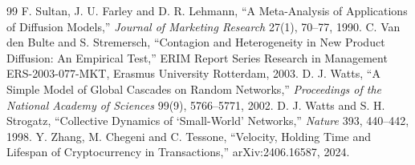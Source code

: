 \documentclass[10pt,a4paper]{article}
\theoremstyle{remark}
\begin{document}
\begin{thebibliography}{99}
 F. Sultan, J. U. Farley and D. R. Lehmann, ``A Meta-Analysis of Applications of Diffusion Models,'' \emph{Journal of Marketing Research} 27(1), 70--77, 1990.
 C. Van den Bulte and S. Stremersch, ``Contagion and Heterogeneity in New Product Diffusion: An Empirical Test,'' ERIM Report Series Research in Management ERS-2003-077-MKT, Erasmus University Rotterdam, 2003.
 D. J. Watts, ``A Simple Model of Global Cascades on Random Networks,'' \emph{Proceedings of the National Academy of Sciences} 99(9), 5766--5771, 2002.
 D. J. Watts and S. H. Strogatz, ``Collective Dynamics of `Small-World' Networks,'' \emph{Nature} 393, 440--442, 1998.
 Y. Zhang, M. Chegeni and C. Tessone, ``Velocity, Holding Time and Lifespan of Cryptocurrency in Transactions,'' arXiv:2406.16587, 2024.
\end{thebibliography}
\end{document}

